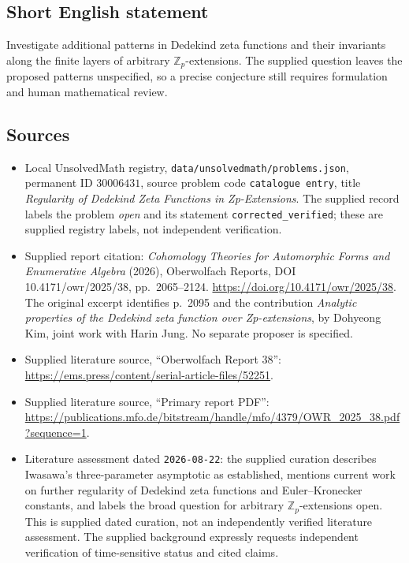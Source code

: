 \documentclass[11pt]{article}
\newcommand{\Z}{\mathbb{Z}}
\begin{document}
\subsection{Short English statement}
Investigate additional patterns in Dedekind zeta functions and their invariants along the finite layers of arbitrary \(\Z_p\)-extensions. The supplied question leaves the proposed patterns unspecified, so a precise conjecture still requires formulation and human mathematical review.
\subsection{Sources}
\begin{itemize}
\item Local UnsolvedMath registry, \texttt{data/unsolvedmath/problems.json}, permanent ID \(30006431\), source problem code \texttt{catalogue entry}, title \emph{Regularity of Dedekind Zeta Functions in Zp-Extensions}. The supplied record labels the problem \emph{open} and its statement \texttt{corrected\_verified}; these are supplied registry labels, not independent verification.
\item Supplied report citation: \emph{Cohomology Theories for Automorphic Forms and Enumerative Algebra} (2026), Oberwolfach Reports, DOI 10.4171/owr/2025/38, pp.~2065--2124. \url{https://doi.org/10.4171/owr/2025/38}. The original excerpt identifies p.~2095 and the contribution \emph{Analytic properties of the Dedekind zeta function over Zp-extensions}, by Dohyeong Kim, joint work with Harin Jung. No separate proposer is specified.
\item Supplied literature source, ``Oberwolfach Report 38'': \url{https://ems.press/content/serial-article-files/52251}.
\item Supplied literature source, ``Primary report PDF'': \url{https://publications.mfo.de/bitstream/handle/mfo/4379/OWR_2025_38.pdf?sequence=1}.
\item Literature assessment dated \texttt{2026-08-22}: the supplied curation describes Iwasawa's three-parameter asymptotic as established, mentions current work on further regularity of Dedekind zeta functions and Euler--Kronecker constants, and labels the broad question for arbitrary \(\Z_p\)-extensions open. This is supplied dated curation, not an independently verified literature assessment. The supplied background expressly requests independent verification of time-sensitive status and cited claims.
\end{itemize}
\end{document}
